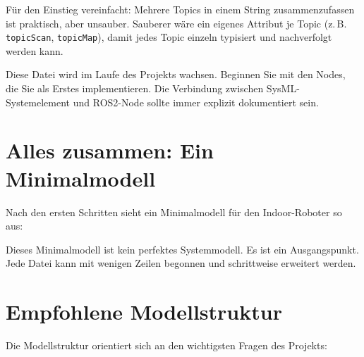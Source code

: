 Für den Einstieg vereinfacht: Mehrere Topics in einem String zusammenzufassen ist praktisch, aber unsauber. Sauberer wäre ein eigenes Attribut je Topic (z.\,B. \texttt{topicScan}, \texttt{topicMap}), damit jedes Topic einzeln typisiert und nachverfolgt werden kann.

Diese Datei wird im Laufe des Projekts wachsen. Beginnen Sie mit den Nodes, die Sie als Erstes implementieren. Die Verbindung zwischen SysML-Systemelement und ROS2-Node sollte immer explizit dokumentiert sein.

\section{Alles zusammen: Ein Minimalmodell}

Nach den ersten Schritten sieht ein Minimalmodell für den Indoor-Roboter so aus:

\begin{center}
\end{center}

Dieses Minimalmodell ist kein perfektes Systemmodell. Es ist ein Ausgangspunkt. Jede Datei kann mit wenigen Zeilen begonnen und schrittweise erweitert werden.

\section{Empfohlene Modellstruktur}
Die Modellstruktur orientiert sich an den wichtigsten Fragen des Projekts:

